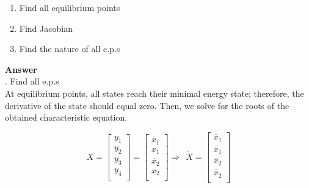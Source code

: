 \documentclass{homeworg}
\begin{document}
\begin{enumerate}[label=(\alph*)]
\item Find all equilibrium points
\item Find Jacobian
\item Find the nature of all e.p.s
\end{enumerate}

\noindent
\textbf{Answer} \\
. Find all e.p.s\\
At equilibrium points, all states reach their minimal energy state; therefore,
the derivative of the state should equal zero. Then, we solve for the roots of
the obtained characteristic equation.

\begin{equation} %
  X =
  \begin{bmatrix}
    y_1\\
    y_2\\
    y_3\\
    y_4\\
  \end{bmatrix}
  =
  \begin{bmatrix}
    \dot{x_1}\\
    x_1\\
    \dot{x_2}\\
    x_2\\
  \end{bmatrix}
  \Rightarrow~~
  \dot{X} =
  \begin{bmatrix}
    \ddot{x_1}\\
    \dot{x_1}\\
    \ddot{x_2}\\
    \dot{x_2}\\
  \end{bmatrix}
\end{equation}
\end{document}
